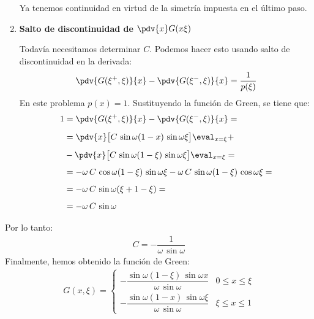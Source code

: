 \begin{ejemplo}
\begin{enumerate}
\par
\noindent
Ya tenemos continuidad en virtud de la simetría impuesta en el último paso.
\item \textbf{Salto de discontinuidad de $\displaystyle \pdv{x} G (x \xi)$}
\par
\noindent
Todavía necesitamos determinar $C$. Podemos hacer esto usando salto de discontinuidad en la derivada:
\begin{align*}
\pdv{G (\xi^{+}, \xi)}{x} - \pdv{G (\xi^{-}, \xi)}{x} = \dfrac{1}{p (\xi)}
\end{align*}
En este problema $p (x) = 1$. Sustituyendo la función de Green, se tiene que:
\begin{align}
\begin{aligned}[b]
1 & = \pdv{G (\xi^{+}, \xi)}{x} - \pdv{G (\xi^{-}, \xi)}{x} = \\[0.5em]
&= \pdv{x} \big[ C \, \sin \omega (1 - x) \, \sin \omega \xi \big] \eval_{x = \xi} + \\[0.5em]
&- \pdv{x} \big[ C \, \sin \omega (1 - \xi) \, \sin \omega \xi \big] \eval_{x = \xi} = \\[0.5em]
&= - \omega \, C \, \cos \omega (1 - \xi) \, \sin \omega \xi - \omega \, C \, \sin \omega (1 - \xi) \, \cos \omega  \xi = \\[0.5em]
&= - \omega \, C \, \sin \omega (\xi + 1 - \xi) = \\[0.5em]
&= - \omega \, C \, \sin \omega
\end{aligned}
\label{eq:ecuacion_07_39}
\end{align}
\end{enumerate}
Por lo tanto:
\begin{align*}
C = - \dfrac{1}{\omega \, \sin \omega}
\end{align*}
Finalmente, hemos obtenido la función de Green:
\begin{align}
G (x, \xi) = \begin{cases}
- \dfrac{\sin \omega (1 - \xi) \, \sin \omega x}{\omega \, \sin \omega} & 0 \leq x \leq \xi \\[1em]
- \dfrac{\sin \omega (1 - x) \, \sin \omega \xi}{\omega \, \sin \omega} & \xi \leq x \leq 1
\end{cases}
\label{eq:ecuacion_07_40}
\end{align}
\end{ejemplo}